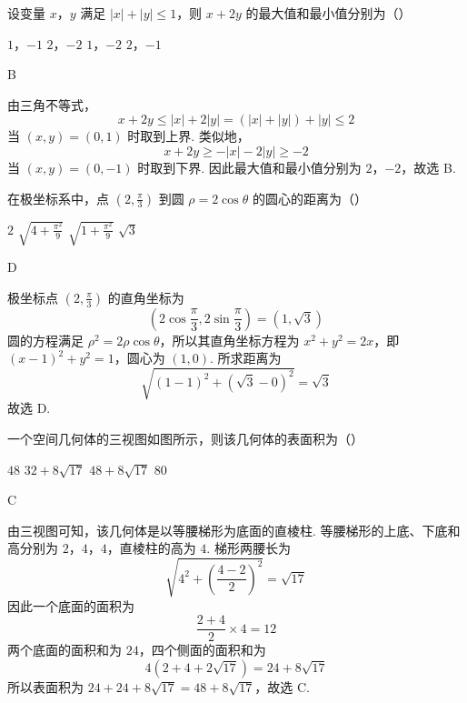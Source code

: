 \begin{problem}
设变量 \(x\)，\(y\) 满足 \(|x| + |y| \leqslant 1\)，则 \(x + 2y\) 的最大值和最小值分别为（\quad）

\choices
    {\(1\)，\(-1\)}
    {\(2\)，\(-2\)}
    {\(1\)，\(-2\)}
    {\(2\)，\(-1\)}
\end{problem}

\begin{answer}
B
\end{answer}

\begin{solution}
由三角不等式，
\[
x+2y\leqslant |x|+2|y|=(|x|+|y|)+|y|\leqslant2
\]
当 \((x,y)=(0,1)\) 时取到上界. 类似地，
\[
x+2y\geqslant-|x|-2|y|\geqslant-2
\]
当 \((x,y)=(0,-1)\) 时取到下界. 因此最大值和最小值分别为 \(2\)，\(-2\)，故选 B.
\end{solution}

\begin{problem}
在极坐标系中，点 \(\left(2, \frac{\pi}{3}\right)\) 到圆 \(\rho = 2\cos \theta\) 的圆心的距离为（\quad）

\choices
    {\(2\)}
    {\(\sqrt{4 + \frac{\pi^2}{9}}\)}
    {\(\sqrt{1 + \frac{\pi^2}{9}}\)}
    {\(\sqrt{3}\)}
\end{problem}

\begin{answer}
D
\end{answer}

\begin{solution}
极坐标点 \(\left(2,\frac{\pi}{3}\right)\) 的直角坐标为
\[
\left(2\cos\frac{\pi}{3},2\sin\frac{\pi}{3}\right)=(1,\sqrt3)
\]
圆的方程满足 \(\rho^2=2\rho\cos\theta\)，所以其直角坐标方程为 \(x^2+y^2=2x\)，即 \((x-1)^2+y^2=1\)，圆心为 \((1,0)\). 所求距离为
\[
\sqrt{(1-1)^2+\left(\sqrt3-0\right)^2}=\sqrt3
\]
故选 D.
\end{solution}

\begin{problem}
一个空间几何体的三视图如图所示，则该几何体的表面积为（\quad）


\choices
    {\(48\)}
    {\(32 + 8\sqrt{17}\)}
    {\(48 + 8\sqrt{17}\)}
    {\(80\)}
\end{problem}

\begin{answer}
C
\end{answer}

\begin{solution}
由三视图可知，该几何体是以等腰梯形为底面的直棱柱. 等腰梯形的上底、下底和高分别为 \(2\)，\(4\)，\(4\)，直棱柱的高为 \(4\). 梯形两腰长为
\[
\sqrt{4^2+\left(\frac{4-2}{2}\right)^2}=\sqrt{17}
\]
因此一个底面的面积为
\[
\frac{2+4}{2}\times4=12
\]
两个底面的面积和为 \(24\)，四个侧面的面积和为
\[
4\left(2+4+2\sqrt{17}\right)=24+8\sqrt{17}
\]
所以表面积为 \(24+24+8\sqrt{17}=48+8\sqrt{17}\)，故选 C.
\end{solution}

